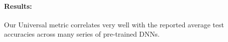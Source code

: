 \paragraph{Results:} 
Our Universal metric correlates very well with the reported average test accuracies across many series of pre-trained DNNs.

\begin{figure}[H]
   \centering
\end{figure}
